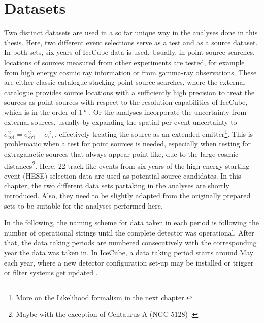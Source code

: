 \chapter{Datasets}
  \label{chp:datasets}

Two distinct datasets are used in a so far unique way in the analyses done in this thesis.
Here, two different event selections serve as a test and as a source dataset.
In both sets, six years of IceCube data is used.
Usually, in point source searches, locations of sources measured from other experiments are tested, for example from high energy cosmic ray information or from gamma-ray observations.
These are either classic catalogue stacking point source searches, where the external catalogue provides source locations with a sufficiently high precision to treat the sources as point sources with respect to the resolution capabilities of IceCube, which is in the order of $\SI{1}{\degree}$ \cite{Aartsen:2013zka,Bos:2015SunMoon}.
Or the analyses incorporate the uncertainty from external sources, usually by expanding the spatial per event uncertainty to $\sigma_\text{tot}^2 = \sigma_\text{evt}^2 + \sigma_\text{src}^2$, effectively treating the source as an extended emitter\footnote{More on the Likelihood formalism in the next chapter.}.
This is problematic when a test for point sources is needed, especially when testing for extragalactic sources that always appear point-like, due to the large cosmic distances\footnote{Maybe with the exception of Centaurus A (NGC 5128) \cite{Yang:2012CentaurusA}.}.
Here, 22 track-like events from six years of the high energy starting event (HESE) selection data are used as potential source candidates.
In this chapter, the two different data sets partaking in the analyses are shortly introduced.
Also, they need to be slightly adapted from the originally prepared sets to be suitable for the analyses performed here.

In the following, the naming scheme for data taken in each period is following the number of operational strings until the complete detector was operational.
After that, the data taking periods are numbered consecutively with the corresponding year the data was taken in.
In IceCube, a data taking period starts around May each year, where a new detector configuration set-up may be installed or trigger or filter systems get updated \cite{Aartsen:2016nxy}.

